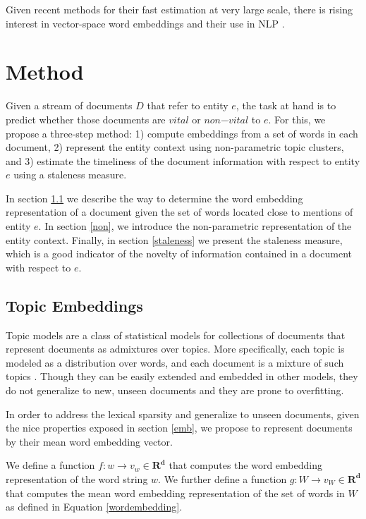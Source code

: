 \documentclass{article}
\begin{document}
Given recent methods for their fast estimation at very large scale, there is rising interest in vector-space word embeddings and their use in NLP \cite{Arvind14}.

\section{Method}
\label{approach}

Given a stream of documents $D$ that refer to entity $e$, the task at hand is to predict whether those documents are $vital$ or $non\mathord{-}vital$ to $e$. For this, we propose a three-step method: 1) compute embeddings from a set of words in each document, 2) represent the entity context using non-parametric topic clusters, and 3) estimate the timeliness of the document information with respect to entity $e$ using a staleness measure.

In section \ref{docwordemb} we describe the way to determine the word embedding representation of a document given the set of words located close to mentions of entity $e$. In section \ref{non}, we introduce the non-parametric representation of the entity context. Finally, in section \ref{staleness} we present the staleness measure, which is a good indicator of the novelty of information contained in a document with respect to $e$.

\subsection{Topic Embeddings}
\label{docwordemb}

Topic models are a class of statistical models for collections of documents that represent documents as admixtures over topics. More specifically, each topic is modeled as a distribution over words, and each document is a mixture of such topics \cite{InouyeRD14}. Though they can be easily extended and embedded in other models, they do not generalize to new, unseen documents and they are prone to overfitting. 

In order to address the lexical sparsity and generalize to unseen documents, given the nice properties exposed in section \ref{emb}, we propose to represent documents by their mean word embedding vector.

We define a function $f : w \rightarrow v_w \in \mathbf{R^d}$ that computes the word embedding representation of the word string $w$. We further define a function $g : W \rightarrow v_W \in \mathbf{R^d}$ that computes the mean word embedding representation of the set of words in $W$ as defined in Equation \ref{wordembedding}.
\end{document}
